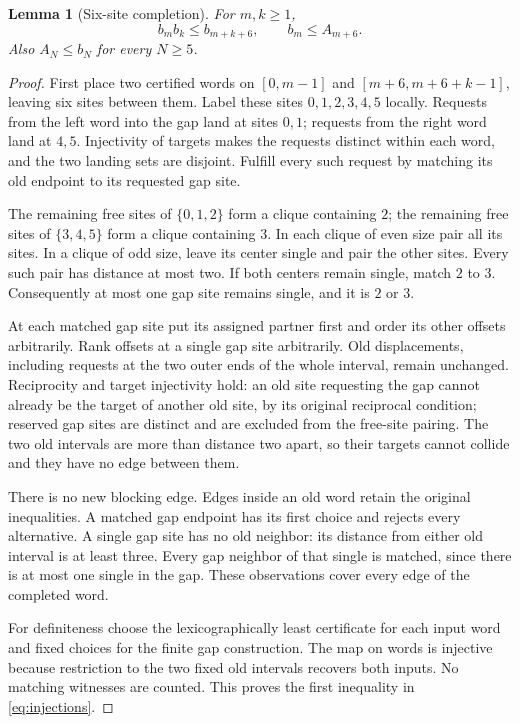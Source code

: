 \documentclass[11pt]{article}
\newtheorem{lemma}[theorem]{Lemma}
\begin{document}
\begin{lemma}[Six-site completion]\label{lem:completion}
For $m,k\geq1$,
\begin{equation}\label{eq:injections}
 b_mb_k\leq b_{m+k+6},\qquad b_m\leq A_{m+6}.
\end{equation}
Also $A_N\leq b_N$ for every $N\geq5$.
\end{lemma}
\begin{proof}
First place two certified words on $[0,m-1]$ and
$[m+6,m+6+k-1]$, leaving six sites between them. Label these sites
$0,1,2,3,4,5$ locally. Requests from the left word into the gap land at
sites $0,1$; requests from the right word land at $4,5$. Injectivity of
targets makes the requests distinct within each word, and the two
landing sets are disjoint. Fulfill every such request by matching its
old endpoint to its requested gap site.

The remaining free sites of $\{0,1,2\}$ form a clique containing $2$;
the remaining free sites of $\{3,4,5\}$ form a clique containing $3$.
In each clique of even size pair all its sites. In a clique of odd size,
leave its center single and pair the other sites. Every such pair has
distance at most two. If both centers remain single, match $2$ to $3$.
Consequently at most one gap site remains single, and it is $2$ or $3$.

At each matched gap site put its assigned partner first and order its
other offsets arbitrarily. Rank offsets at a single gap site arbitrarily.
Old displacements, including requests at the two outer ends of the
whole interval, remain unchanged. Reciprocity and target injectivity
hold: an old site requesting the gap cannot already be the target of
another old site, by its original reciprocal condition; reserved gap
sites are distinct and are excluded from the free-site pairing.
The two old intervals are more than distance two apart, so their targets
cannot collide and they have no edge between them.

There is no new blocking edge. Edges inside an old word retain the
original inequalities. A matched gap endpoint has its first choice and
rejects every alternative. A single gap site has no old neighbor: its
distance from either old interval is at least three. Every gap neighbor
of that single is matched, since there is at most one single in the
gap. These observations cover every edge of the completed word.

For definiteness choose the lexicographically least certificate for each
input word and fixed choices for the finite gap construction. The map
on words is injective because restriction to the two fixed old intervals
recovers both inputs. No matching witnesses are counted. This proves
the first inequality in \eqref{eq:injections}.


\end{proof}
\end{document}
